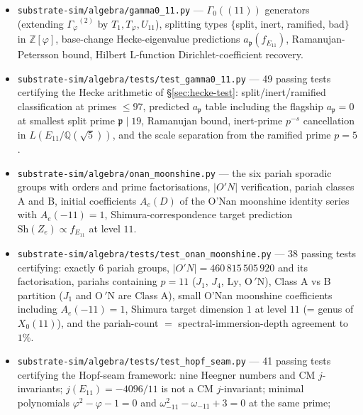 \documentclass[11pt,a4paper]{article}
\theoremstyle{plain}
\theoremstyle{definition}
\theoremstyle{remark}
\numberwithin{equation}{section}
\providecommand{\Zp}{\ensuremath{\mathbb{Z}[\varphi]}}
\providecommand{\Qp}{\ensuremath{\mathbb{Q}(\sqrt{5})}}
\providecommand{\Gphi}{\ensuremath{\Gamma_{\varphi}}}
\begin{document}
\begin{itemize}
  fixing the exact algebraic scale-ratio $20\log_{5}\varphi$, the
  \emph{codimension lock-in} (\texttt{TestGamma0Level11Inclusion}, 12 assertions)
  proving $\Gphi^{(2)}\subseteq\Gamma_{0}((11))$ at index $144$, and the
  \emph{Fibonacci-square lock-in} (\texttt{TestFibonacciSquareLockIn}, 9 assertions)
  showing $144=F_{12}$ is the unique non-trivial square Fibonacci by Cohn (1964).
\item \texttt{substrate-sim/algebra/gamma0\_11.py} --- $\Gamma_{0}((11))$ generators
  (extending $\Gphi^{(2)}$ by $T_{1}, T_{\varphi}, U_{11}$), splitting types
  $\{$split, inert, ramified, bad$\}$ in $\Zp$, base-change Hecke-eigenvalue
  predictions $a_{\mathfrak p}(f_{E_{11}})$, Ramanujan-Petersson bound,
  Hilbert L-function Dirichlet-coefficient recovery.
\item \texttt{substrate-sim/algebra/tests/test\_gamma0\_11.py} --- 49 passing tests
  certifying the Hecke arithmetic of \S\ref{sec:hecke-test}: split/inert/ramified
  classification at primes $\le 97$, predicted $a_{\mathfrak p}$ table including
  the flagship $a_{\mathfrak p}=0$ at smallest split prime $\mathfrak p\mid 19$,
  Ramanujan bound, inert-prime $p^{-s}$ cancellation in $L(E_{11}/\Qp)$,
  and the scale separation from the ramified prime $p=5$.
\item \texttt{substrate-sim/algebra/onan\_moonshine.py} --- the six pariah
  sporadic groups with orders and prime factorisations, $|O'N|$ verification,
  pariah classes A and B, initial coefficients $A_{e}(D)$ of the O'Nan
  moonshine identity series with $A_{e}(-11)=1$, Shimura-correspondence
  target prediction $\mathrm{Sh}(Z_{e})\propto f_{E_{11}}$ at level $11$.
\item \texttt{substrate-sim/algebra/tests/test\_onan\_moonshine.py} --- 38 passing
  tests certifying: exactly $6$ pariah groups, $|O'N|=460\,815\,505\,920$ and its
  factorisation, pariahs containing $p=11$ ($J_{1}$, $J_{4}$, $\mathrm{Ly}$,
  $\mathrm{O\,'\!N}$), Class A vs B partition ($J_{1}$ and $\mathrm{O\,'\!N}$
  are Class A), small O'Nan moonshine coefficients
  including $A_{e}(-11)=1$, Shimura target dimension $1$ at level $11$
  (= genus of $X_{0}(11)$), and the pariah-count $=$ spectral-immersion-depth
  agreement to $1\%$.
\item \texttt{substrate-sim/algebra/tests/test\_hopf\_seam.py} --- 41 passing tests certifying
  the Hopf-seam framework: nine Heegner numbers and CM $j$-invariants;
  $j(E_{11})=-4096/11$ is not a CM $j$-invariant; minimal polynomials
  $\varphi^{2}-\varphi-1=0$ and $\omega_{-11}^{2}-\omega_{-11}+3=0$ at the same prime;

\end{itemize}
\end{document}
